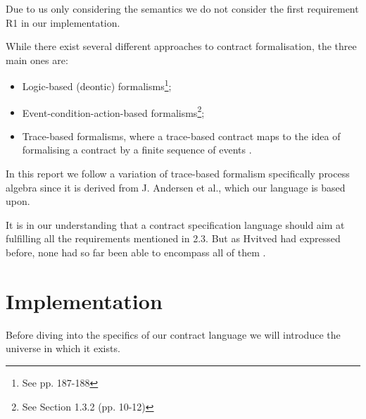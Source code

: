 \documentclass{ituthesis}
\begin{document}
Due to us only considering the semantics we do not consider the first requirement R1 in our implementation.

While there exist several different approaches to contract formalisation, the three main ones are:
\begin{itemize}
    \item Logic-based (deontic) formalisms\footnote{See \cite{hvitved2011contract} pp. 187-188};
    \item Event-condition-action-based formalisms\footnote{See \cite{hvitved2011contract} Section 1.3.2 (pp. 10-12)};
    \item Trace-based formalisms, where a trace-based contract maps to the idea of formalising a contract by a finite sequence of events \cite{andersen2006compositional}.
\end{itemize}

In this report we follow a variation of trace-based formalism specifically process algebra since it is derived from J. Andersen et al., which our language is based upon.

It is in our understanding that a contract specification language should aim at fulfilling all the requirements mentioned in 2.3. But as Hvitved had expressed before, none had so far been able to encompass all of them \cite{hvitved2011contract}.


\chapter{Implementation}

Before diving into the specifics of our contract language we will introduce the universe in which it exists.
\end{document}
